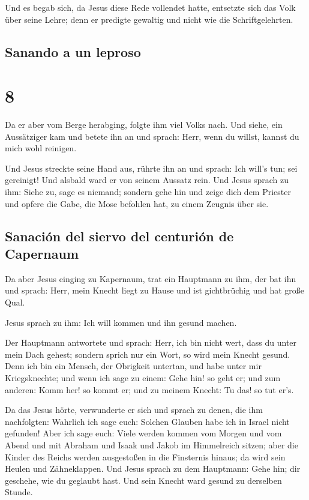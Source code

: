  Und es begab sich, da Jesus diese Rede vollendet hatte,
entsetzte sich das Volk über seine Lehre;  denn er
predigte gewaltig und nicht wie die Schriftgelehrten.

\hypertarget{sanando-a-un-leproso}{%
\subsection{Sanando a un leproso}\label{sanando-a-un-leproso}}

\hypertarget{section-7}{%
\section{8}\label{section-7}}

 Da er aber vom Berge herabging, folgte ihm viel Volks
nach.  Und siehe, ein Aussätziger kam und betete ihn an
und sprach: Herr, wenn du willst, kannst du mich wohl reinigen.

 Und Jesus streckte seine Hand aus, rührte ihn an und
sprach: Ich will's tun; sei gereinigt! Und alsbald ward er von seinem
Aussatz rein.  Und Jesus sprach zu ihm: Siehe zu, sage es
niemand; sondern gehe hin und zeige dich dem Priester und opfere die
Gabe, die Mose befohlen hat, zu einem Zeugnis über sie.

\hypertarget{sanaciuxf3n-del-siervo-del-centuriuxf3n-de-capernaum}{%
\subsection{Sanación del siervo del centurión de
Capernaum}\label{sanaciuxf3n-del-siervo-del-centuriuxf3n-de-capernaum}}

 Da aber Jesus einging zu Kapernaum, trat ein Hauptmann zu
ihm, der bat ihn  und sprach: Herr, mein Knecht liegt zu
Hause und ist gichtbrüchig und hat große Qual.

 Jesus sprach zu ihm: Ich will kommen und ihn gesund
machen.

 Der Hauptmann antwortete und sprach: Herr, ich bin nicht
wert, dass du unter mein Dach gehest; sondern sprich nur ein Wort, so
wird mein Knecht gesund.  Denn ich bin ein Mensch, der
Obrigkeit untertan, und habe unter mir Kriegsknechte; und wenn ich sage
zu einem: Gehe hin! so geht er; und zum anderen: Komm her! so kommt er;
und zu meinem Knecht: Tu das! so tut er's.

 Da das Jesus hörte, verwunderte er sich und sprach zu
denen, die ihm nachfolgten: Wahrlich ich sage euch: Solchen Glauben habe
ich in Israel nicht gefunden!  Aber ich sage euch: Viele
werden kommen vom Morgen und vom Abend und mit Abraham und Isaak und
Jakob im Himmelreich sitzen;  aber die Kinder des Reichs
werden ausgestoßen in die Finsternis hinaus; da wird sein Heulen und
Zähneklappen.  Und Jesus sprach zu dem Hauptmann: Gehe
hin; dir geschehe, wie du geglaubt hast. Und sein Knecht ward gesund zu
derselben Stunde.

